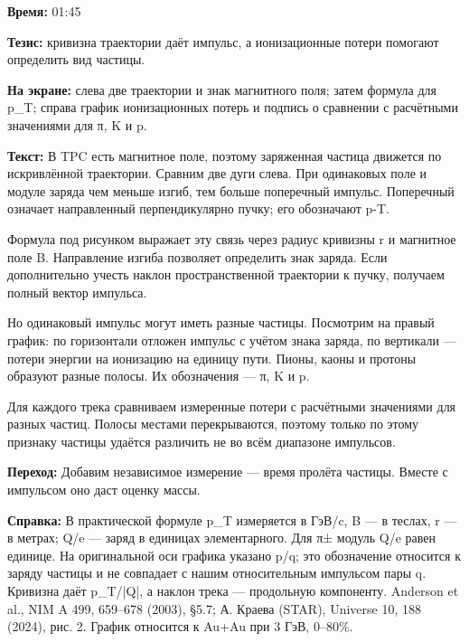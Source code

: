 \textbf{Время:} 01:45

\textbf{Тезис:} кривизна траектории даёт импульс, а ионизационные потери помогают определить вид частицы.

\textbf{На экране:} слева две траектории и знак магнитного поля; затем формула для p\_T; справа график ионизационных потерь и подпись о сравнении с расчётными значениями для π, K и p.

\textbf{Текст:} В TPC есть магнитное поле, поэтому заряженная частица движется по искривлённой траектории. Сравним две дуги слева. При одинаковых поле и модуле заряда чем меньше изгиб, тем больше поперечный импульс. Поперечный означает направленный перпендикулярно пучку; его обозначают p-T.

Формула под рисунком выражает эту связь через радиус кривизны r и магнитное поле B. Направление изгиба позволяет определить знак заряда. Если дополнительно учесть наклон пространственной траектории к пучку, получаем полный вектор импульса.

Но одинаковый импульс могут иметь разные частицы. Посмотрим на правый график: по горизонтали отложен импульс с учётом знака заряда, по вертикали — потери энергии на ионизацию на единицу пути. Пионы, каоны и протоны образуют разные полосы. Их обозначения — π, K и p.

Для каждого трека сравниваем измеренные потери с расчётными значениями для разных частиц. Полосы местами перекрываются, поэтому только по этому признаку частицы удаётся различить не во всём диапазоне импульсов.

\textbf{Переход:} Добавим независимое измерение — время пролёта частицы. Вместе с импульсом оно даст оценку массы.

\textbf{Справка:} В практической формуле p\_T измеряется в ГэВ/c, B — в теслах, r — в метрах; Q/e — заряд в единицах элементарного. Для π± модуль Q/e равен единице. На оригинальной оси графика указано p/q; это обозначение относится к заряду частицы и не совпадает с нашим относительным импульсом пары q. Кривизна даёт p\_T/|Q|, а наклон трека — продольную компоненту. Anderson et al., NIM A 499, 659–678 (2003), §5.7; А. Краева (STAR), Universe 10, 188 (2024), рис. 2. График относится к Au+Au при 3 ГэВ, 0–80\%.
